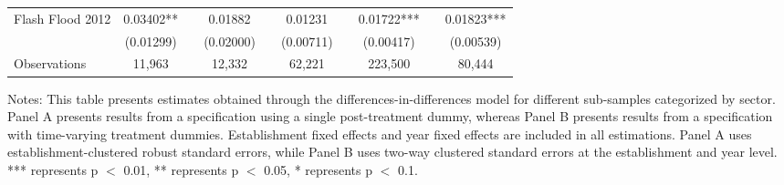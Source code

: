 \begin{table}[htb!]
{\begin{threeparttable}
\begin{tabular}{lccccccccc}
    Flash Flood 2012 & 0.03402** &  & 0.01882 &  & 0.01231 &  & 0.01722*** &  & 0.01823*** \\
                     & (0.01299) &  & (0.02000) &  & (0.00711) &  & (0.00417) &  & (0.00539) \\
    Observations & 11{,}963 &  & 12{,}332 &  & 62{,}221 &  & 223{,}500 &  & 80{,}444 \\
\bottomrule
    \end{tabular}%
    \begin{tablenotes}[flushleft] \item \small Notes: This table presents estimates obtained through the differences-in-differences model for different sub-samples categorized by sector. Panel A presents results from a specification using a single post-treatment dummy, whereas Panel B presents results from a specification with time-varying treatment dummies. Establishment fixed effects and year fixed effects are included in all estimations. Panel A uses establishment-clustered robust standard errors, while Panel B uses two-way clustered standard errors at the establishment and year level. *** represents p $<$ 0.01, ** represents p $<$ 0.05, * represents p $<$ 0.1.
    \end{tablenotes}
    \end{threeparttable}
    }
\end{table}%
